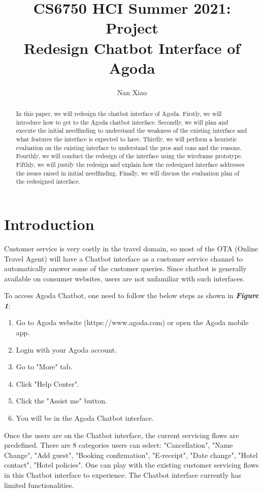 \documentclass[
	letterpaper, %
]{jdf}
\author{Nan Xiao}
\title{CS6750 HCI Summer 2021:\\Project\\Redesign Chatbot Interface of Agoda}
\begin{document}

\maketitle

\begin{abstract}
	In this paper, we will redesign the chatbot interface of Agoda. Firstly, we will introduce how to get to the Agoda chatbot interface. Secondly, we will plan and execute the initial needfinding to understand the weakness of the existing interface and what features the interface is expected to have. Thirdly, we will perform a heuristic evaluation on the existing interface to understand the pros and cons and the reasons. Fourthly, we will conduct the redesign of the interface using the wireframe prototype. Fifthly, we will justify the redesign and explain how the redesigned interface addresses the issues raised in initial needfinding. Finally, we will discuss the evaluation plan of the redesigned interface.
\end{abstract}

\section{Introduction}
Customer service is very costly in the travel domain, so most of the OTA (Online Travel Agent) will have a Chatbot interface as a customer service channel to automatically answer some of the customer queries. Since chatbot is generally available on consumer websites, users are not unfamiliar with such interfaces. 

To access Agoda Chatbot, one need to follow the below steps as shown in \textit{\textbf{Figure 1}}:
\begin{enumerate}
	\item Go to Agoda website (https://www.agoda.com) or open the Agoda mobile app.
	\item Login with your Agoda account.
	\item Go to "More" tab. 
	\item Click "Help Center".
	\item Click the "Assist me" button.
	\item You will be in the Agoda Chatbot interface.
\end{enumerate}

Once the users are on the Chatbot interface, the current servicing flows are predefined. There are 8 categories users can select: "Cancellation", "Name Change", "Add guest", "Booking confirmation", "E-receipt", "Date change", "Hotel contact", "Hotel policies". One can play with the existing customer servicing flows in this Chatbot interface to experience. The Chatbot interface currently has limited functionalities.
\end{document}
